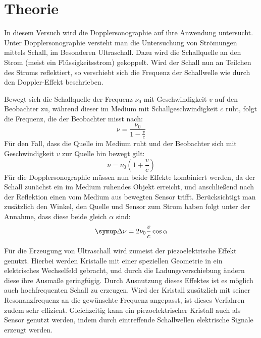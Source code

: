 \section{Theorie}
\label{sec:Theorie}
In diesem Versuch wird die Dopplersonographie auf ihre Anwendung untersucht.
Unter Dopplersonographie versteht man die Untersuchung von Strömungen mittels Schall, im Besonderen Ultraschall.
Dazu wird die Schallquelle an den Strom (meist ein Flüssigkeitsstrom) gekoppelt.
Wird der Schall nun an Teilchen des Stroms reflektiert, so verschiebt sich die Frequenz der Schallwelle wie durch den
Doppler-Effekt beschrieben.


Bewegt sich die Schallquelle der Frequenz $\nu_0$ mit Geschwindigkeit $v$ auf den Beobachter zu,
während dieser im Medium mit Schallgeschwindigkeit $c$ ruht, folgt die Frequenz, die der Beobachter misst nach:
\begin{equation}
	\nu = \frac{\nu_0}{1 - \frac{v}{c}}
\end{equation}
Für den Fall, dass die Quelle im Medium ruht und der Beobachter sich mit Geschwindigkeit $v$ zur Quelle hin bewegt gilt:
\begin{equation}
	\nu = \nu_0\left(1+\frac{v}{c}\right)
\end{equation}
Für die Dopplersonographie müssen nun beide Effekte kombiniert werden, da der Schall zunächst ein im Medium ruhendes Objekt erreicht,
und anschließend nach der Reflektion einen vom Medium aus bewegten Sensor trifft.
Berücksichtigt man zusätzlich den Winkel, den Quelle und Sensor zum Strom haben folgt unter der Annahme,
dass diese beide gleich $\alpha$ sind:
\begin{equation}
	\label{eq:geschw}
	\symup\Delta\nu = 2\nu_0\frac{v}{c}\cos \alpha
\end{equation}


Für die Erzeugung von Ultraschall wird zumeist der piezoelektrische Effekt genutzt.
Hierbei werden Kristalle mit einer speziellen Geometrie in ein elektrisches Wechselfeld gebracht,
und durch die Ladungsverschiebung ändern diese ihre Ausmaße geringfügig.
Durch Ausnutzung dieses Effektes ist es möglich auch hochfrequenten Schall zu erzeugen.
Wird der Kristall zusätzlich mit seiner Resonanzfrequenz an die gewünschte Frequenz angepasst,
ist dieses Verfahren zudem sehr effizient.
Gleichzeitig kann ein piezoelektrischer Kristall auch als Sensor genutzt werden, indem durch eintreffende Schallwellen
elektrische Signale erzeugt werden.
